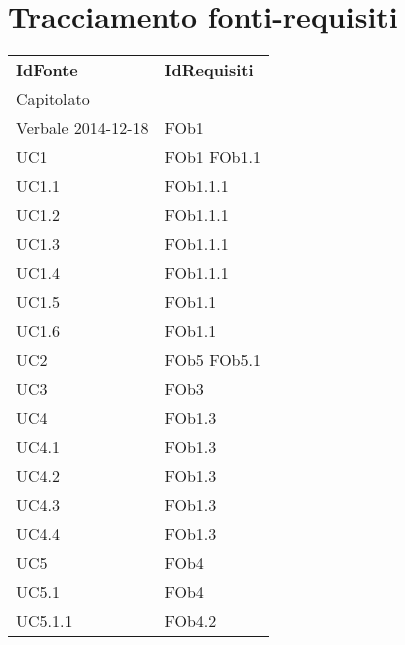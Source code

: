 \section{Tracciamento fonti-requisiti}
\begin{longtable}{|l|l|}
\hline
\textbf{IdFonte} & \textbf{IdRequisiti} \\ 
Capitolato &  \\ 
\hline
		Verbale 2014-12-18 & FOb1 \linebreak   \\
\hline
		UC1 & FOb1 \linebreak  FOb1.1 \linebreak   \\
\hline
		UC1.1 & FOb1.1.1 \linebreak   \\
\hline
		UC1.2 & FOb1.1.1 \linebreak   \\
\hline
		UC1.3 & FOb1.1.1 \linebreak   \\
\hline
		UC1.4 & FOb1.1.1 \linebreak   \\
\hline
		UC1.5 & FOb1.1 \linebreak   \\
\hline
		UC1.6 & FOb1.1 \linebreak   \\
\hline
		UC2 & FOb5 \linebreak  FOb5.1 \linebreak   \\
\hline
		UC3 & FOb3 \linebreak   \\
\hline
		UC4 & FOb1.3 \linebreak   \\
\hline
		UC4.1 & FOb1.3 \linebreak   \\
\hline
		UC4.2 & FOb1.3 \linebreak   \\
\hline
		UC4.3 & FOb1.3 \linebreak   \\
\hline
		UC4.4 & FOb1.3 \linebreak   \\
\hline
		UC5 & FOb4 \linebreak   \\
\hline
		UC5.1 & FOb4 \linebreak   \\
\hline
		UC5.1.1 & FOb4.2 \linebreak   \\

\end{longtable}
